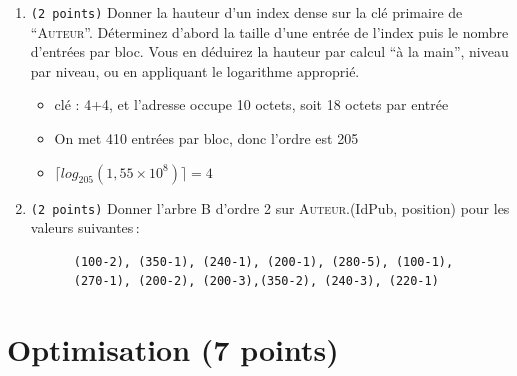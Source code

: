 \begin{enumerate}
	\item {\tt (2~points)} Donner la hauteur d'un index dense sur la clé primaire de ``\textsc{Auteur}''.
    Déterminez d'abord la taille d'une entrée de l'index puis
    le nombre d'entrées par bloc.  Vous en déduirez la hauteur par
    calcul ``à la main'', niveau par niveau, ou en appliquant le logarithme
    approprié.

\begin{solution}
\begin{itemize}
	\item clé : 4+4, et l'adresse occupe  10 octets, soit 18 octets par entrée
	\item On met 410 entrées par bloc, donc l'ordre est 205
	\item $\lceil log_{205}(1,55 \times 10^8)\rceil = 4$
\end{itemize}
\end{solution}

	\item {\tt (2~points)} Donner l'arbre B  d'ordre 2 sur \textsc{Auteur}.(IdPub, position)
  pour les valeurs suivantes\,:\\

  \begin{verbatim}
      (100-2), (350-1), (240-1), (200-1), (280-5), (100-1),
      (270-1), (200-2), (200-3),(350-2), (240-3), (220-1)
  \end{verbatim}

  \begin{solution}
\begin{figure}
	\centering
	\caption{}
	\label{fig:2018-06btree}
\end{figure}
\end{solution}

\end{enumerate}

\section{Optimisation (7 points)}

